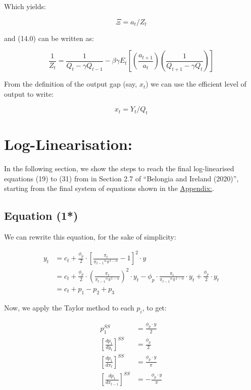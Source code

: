 \documentclass[11pt,preprint, authoryear]{elsarticle}
\numberwithin{equation}{section}
\numberwithin{figure}{section}
\numberwithin{table}{section}
\begin{document}
Which yields:

\[\Xi = a_t/Z_t\]

and (14.0) can be written as:

\[\frac{1}{Z_{t}}=\frac{1}{Q_{t}-\gamma Q_{t-1}}-\beta \gamma E_{t}\left[\left(\frac{a_{t+1}}{a_{t}}\right)\left(\frac{1}{Q_{t+1}-\gamma Q_{t}}\right)\right] \tag{14}\]

From the definition of the output gap (say, \(x_t\)) we can use the
efficient level of output to write:

\[x_t = Y_t/Q_t \tag{15}\]

\newpage

\hypertarget{log-linearisation}{%
\section{Log-Linearisation:}\label{log-linearisation}}

In the following section, we show the steps to reach the final
log-linearised equations (19) to (31) from in Section 2.7 of ``Belongia
and Ireland (2020)'', starting from the final system of equations shown
in the \protect\hyperlink{appendix}{Appendix:}.

\hypertarget{equation-1}{%
\subsection{Equation (1*)}\label{equation-1}}

We can rewrite this equation, for the sake of simplicity:

\[\begin{aligned}
y_{t} &= c_t + \frac{\phi_{p}}{2} \cdot \left[ \frac{\pi_{t}}{{\pi_{t-1}}^{\alpha} \pi^{1-\alpha}} -1 \right]^{2} \cdot y\\
&=c_{t} + \frac{\phi_{p}}{2} \cdot \left(\frac{\pi_{t}}{{\pi_{t-1}}^{\alpha} \pi^{1-\alpha}} \right)^2 \cdot y_{t} - \phi_{p} \cdot
\frac{\pi_{t}}{{\pi_{t-1}}^{\alpha} \pi^{1-\alpha}} \cdot y_{t} + \frac{\phi_{p}}{2} \cdot y_{t}\\
&= c_t + p_{1} - p_{2} + p_{3}
\end{aligned}\]

Now, we apply the Taylor method to each \(p_{i}\), to get:

\[\begin{aligned}
p_{1}^{SS}&=\frac{\phi_{p} \cdot y}{2}\\\left[\frac{dp_{1}}{dy_{t}} \right]^{SS} &= \frac{\phi_{p}}{2}\\\left[\frac{dp_{1}}{d\pi_{t}} \right]^{SS} &= \frac{\phi_{p} \cdot y}{\pi}\\\left[\frac{dp_{1}}{d\pi_{t-1}} \right]^{SS} &= - \frac{\phi_{p} \cdot y}{\pi}
\end{aligned}\]
\end{document}
